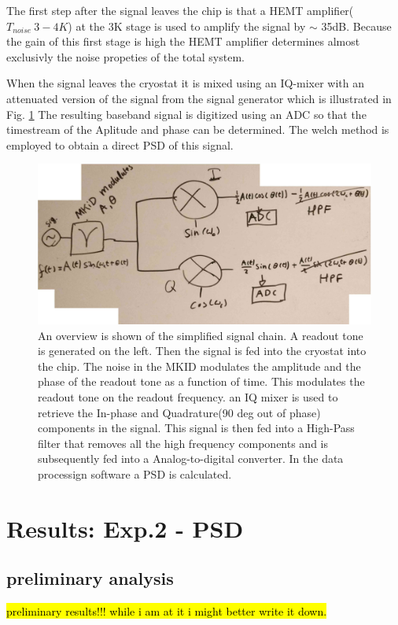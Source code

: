 The first step after the signal leaves the chip is that a HEMT amplifier($T_{noise}~3-4K$\cite[p.83]{devisserVisser2014Quasiparticle2014}) at the 3K stage is used to amplify the signal by $\sim$ 35dB\cite[p.83]{devisserVisser2014Quasiparticle2014}. Because the gain of this first stage is high the HEMT amplifier determines almost exclusivly the noise propeties of the total system.\cite[Eq 8.37]{couchDigitalAnalogCommunication2013}

When the signal leaves the cryostat it is mixed using an IQ-mixer with an attenuated version of the signal from the signal generator which is illustrated in Fig. \ref{} The resulting baseband signal is digitized using an ADC so that the timestream of the Aplitude and phase can be determined.
The welch method is employed to obtain a direct PSD of this signal.
\begin{figure}[ht]
	\centering
	\includegraphics[width=.80\linewidth]{figures/ch5_measurement/PSD_IQmixing_overview_Edit.jpg}
	\caption{An overview is shown of the simplified signal chain. A readout tone is generated on the left. Then the signal is fed into the cryostat into the chip. The noise in the MKID modulates the amplitude and the phase of the readout tone as a function of time. This modulates the readout tone on the readout frequency. an IQ mixer is used to retrieve the In-phase and Quadrature(90 deg out of phase) components in the signal. This signal is then fed into a High-Pass filter that removes all the high frequency components and is subsequently fed into a Analog-to-digital converter. In the data processign software a PSD is calculated.  }
	\label{fig:ch6_Signal_overview}
\end{figure}




\section{Results: Exp.2 - PSD}
\subsection*{preliminary analysis}
\hl{preliminary results!!! while i am at it i might better write it down.}


